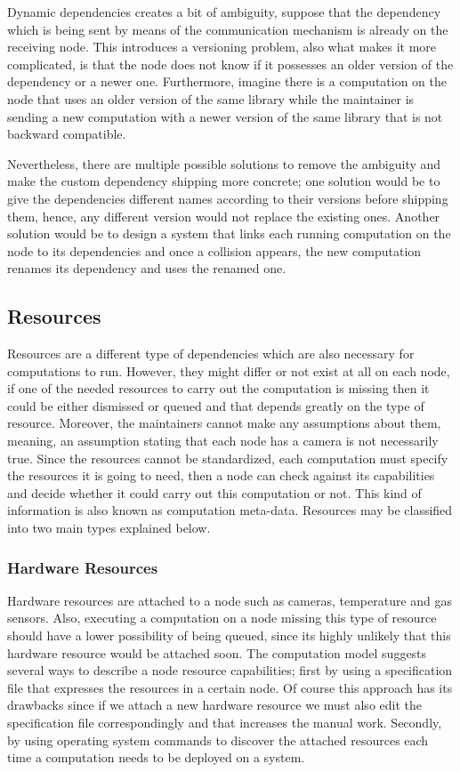  
  Dynamic dependencies creates a bit of ambiguity, suppose that the dependency which is being sent by means of the communication mechanism is already on the receiving node. This introduces a  versioning problem, also what makes it more complicated, is that the node does not know if it possesses an older version of the dependency or a newer one. Furthermore,  imagine there is a computation on the node that uses an older version of the same library while the maintainer is sending a new computation with a newer version of the same library that is not backward compatible. 
  
   Nevertheless, there are multiple possible solutions to remove the ambiguity and make the custom dependency shipping more concrete; one solution would be to give the dependencies different names according to their versions before shipping them, hence, any different version would not replace the existing ones. Another solution would be to design a system that links each running computation on the node to its dependencies and once a collision appears, the new computation renames its dependency and uses the renamed one.
 
\newpage
\subsection {Resources}



Resources are a different type of dependencies which are also necessary for computations to run. However, they might differ or not exist at all on each node, if one of the needed resources to carry out the computation is missing then it could be either dismissed or queued and that depends greatly on the type of resource. Moreover, the maintainers cannot make any assumptions about them, meaning, an assumption stating that each node has a camera is not necessarily true. Since the resources cannot be standardized, each computation must specify the resources it is going to need, then a node can check against its capabilities and decide whether it could carry out this computation or not. This kind of information is also known as computation meta-data. Resources may be classified into two main types explained below.

\subsubsection{Hardware Resources}

  Hardware resources  are attached to a node such as cameras, temperature and gas sensors.  Also, executing a computation on a node missing this type of resource should have a lower possibility of being queued, since its highly unlikely that this hardware resource would be attached soon. The computation model suggests several ways to describe a node resource capabilities; first by using a specification file that expresses the resources in a certain node. Of course this approach has its drawbacks since if we attach a new hardware resource we must also edit the specification file correspondingly and that increases the manual work. Secondly, by using operating system commands to discover the attached resources each time a computation needs to be deployed on a system. 
  
